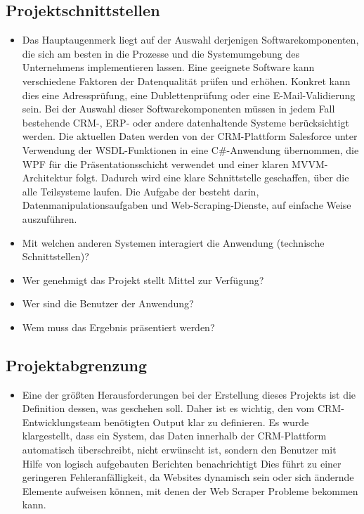\subsection{Projektschnittstellen} 
\label{sec:Projektschnittstellen}
\begin{itemize}
	\item Das Hauptaugenmerk liegt auf der Auswahl derjenigen Softwarekomponenten, die sich am besten in die Prozesse und die Systemumgebung des Unternehmens implementieren lassen. 
	Eine geeignete Software kann verschiedene Faktoren der Datenqualität prüfen und erhöhen. Konkret kann dies eine Adressprüfung, eine Dublettenprüfung oder eine E-Mail-Validierung sein.
	Bei der Auswahl dieser Softwarekomponenten müssen in jedem Fall bestehende CRM-, ERP- oder andere datenhaltende Systeme berücksichtigt werden.
	Die aktuellen Daten werden von der CRM-Plattform Salesforce unter Verwendung der WSDL-Funktionen in eine C\#-Anwendung übernommen, die WPF für die Präsentationsschicht verwendet und einer klaren MVVM-Architektur folgt.
	Dadurch wird eine klare Schnittstelle geschaffen, über die alle Teilsysteme laufen.
	Die Aufgabe der besteht darin, Datenmanipulationsaufgaben und Web-Scraping-Dienste, auf einfache Weise auszuführen. 

	\item Mit welchen anderen Systemen interagiert die Anwendung (technische Schnittstellen)?
	\item Wer genehmigt das Projekt \bzw stellt Mittel zur Verfügung? 
	\item Wer sind die Benutzer der Anwendung?
	\item Wem muss das Ergebnis präsentiert werden?
\end{itemize}


\subsection{Projektabgrenzung} 
\label{sec:Projektabgrenzung}
\begin{itemize}
	\item Eine der größten Herausforderungen bei der Erstellung dieses Projekts ist die Definition dessen, was geschehen soll.
	Daher ist es wichtig, den vom CRM-Entwicklungsteam benötigten Output klar zu definieren. 
	Es wurde klargestellt, dass ein System, das Daten innerhalb der CRM-Plattform automatisch überschreibt, nicht erwünscht ist, sondern den Benutzer mit Hilfe von logisch aufgebauten Berichten benachrichtigt 
	Dies führt zu einer geringeren Fehleranfälligkeit, da Websites dynamisch sein oder sich ändernde Elemente aufweisen können, mit denen der Web Scraper Probleme bekommen kann.
\end{itemize}
